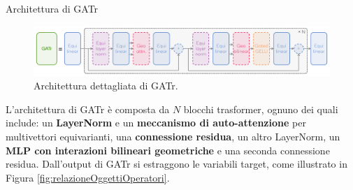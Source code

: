 \begin{frame}{Architettura di GATr}
    \begin{figure}
        \centering
        \includegraphics[width=1\textwidth]{../Images/GatrArchitecture.png}
        \caption{Architettura dettagliata di GATr.}
    \end{figure}
    
    L'architettura di GATr è composta da \( N \) blocchi trasformer, ognuno dei quali 
    include: un \textbf{LayerNorm} e un \textbf{meccanismo di auto-attenzione} per multivettori 
    equivarianti, una \textbf{connessione residua}, un altro LayerNorm, un \textbf{MLP con interazioni 
    bilineari geometriche} e una seconda connessione residua. 
    Dall’output di GATr si estraggono le variabili target, come illustrato in 
    Figura \ref{fig:relazioneOggettiOperatori}.
\end{frame}
